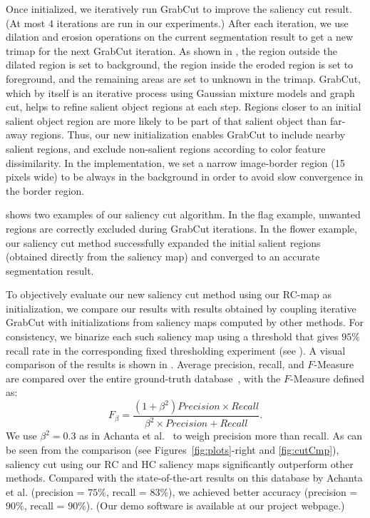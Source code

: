 \documentclass[final]{cvpr}
\begin{document}
Once initialized, we iteratively run GrabCut to improve the saliency cut result. (At most $4$ iterations are run in our experiments.)
%
After each iteration, we use dilation and erosion operations on the current segmentation
result to get a new trimap for the next GrabCut iteration.
%
As shown in , the region outside the dilated region is set to
background, the region inside the eroded region is set to foreground, and the remaining
areas are set to unknown in the trimap.
%
GrabCut, which by itself is an iterative process using Gaussian mixture models and graph cut,
helps to refine salient object regions at each step.
%
Regions closer to an initial salient object region are more likely to be part of that salient object than far-away regions.
%
Thus, our new initialization enables GrabCut to include nearby salient regions,
and exclude non-salient regions according to color feature dissimilarity.
%
In the implementation, we set a narrow image-border region (15 pixels wide) to be always in the background in order to
avoid slow convergence in the border region.


 shows two examples of our saliency cut algorithm.
%
In the flag example, unwanted regions are correctly excluded during GrabCut iterations.
%
In the flower example, our saliency cut method successfully expanded the initial salient regions
(obtained directly from the saliency map) and converged to an accurate segmentation result.

To objectively evaluate our new saliency cut method using our RC-map as initialization,
we compare our results with results obtained by coupling iterative GrabCut with initializations
from saliency maps computed by other methods.
%
For consistency, we binarize each such saliency map using a threshold that gives $95\%$
recall rate in the corresponding fixed thresholding experiment (see ). A visual comparison of the results is shown in .
%
Average precision, recall, and $F$-Measure are compared over the entire ground-truth
database~\cite{09cvpr/Achanta_FTSaliency}, with the $F$-Measure defined as:
\begin{equation}\label{equ:FMeasure}
    F_{\beta} = \frac{(1+\beta^2)Precision \times Recall}{\beta^2 \times Precision + Recall}.
\end{equation}
We use $\beta^2 = 0.3$ as in Achanta et al.~\cite{09cvpr/Achanta_FTSaliency} to weigh
precision more than recall.
%
As can be seen from the comparison (see Figures~\ref{fig:plots}-right and \ref{fig:cutCmp}),
saliency cut using our RC and HC saliency maps significantly outperform other methods.
%
Compared with the state-of-the-art results on this database by Achanta et al. (precision = $75\%$, recall = $83\%$), we achieved better accuracy (precision = $90\%$, recall = $90\%$). (Our demo software is available at our project webpage.)
\end{document}
